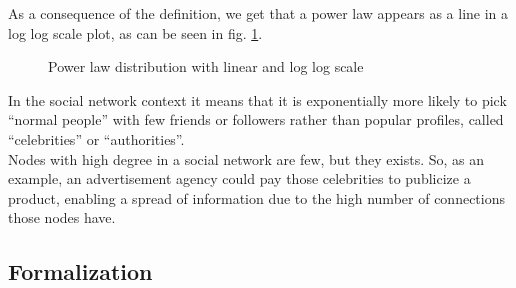 As a consequence of the definition, we get that a power law appears as a line in a log log scale plot, as can be seen in fig. \ref{fig:power-law}.

\begin{figure}
    \centering
    \hskip 7pt
    \caption{Power law distribution with linear and log log scale}
    \label{fig:power-law}
\end{figure}

In the social network context it means that it is exponentially more likely to pick ``normal people'' with few friends or followers rather than popular profiles, called ``celebrities'' or ``authorities''.\\
Nodes with high degree in a social network are few, but they exists. So, as an example, an advertisement agency could pay those celebrities to publicize a product, enabling a spread of information due to the high number of connections those nodes have.
    
    
\subsection{Formalization}\label{sec:pref-attach-formalization}

